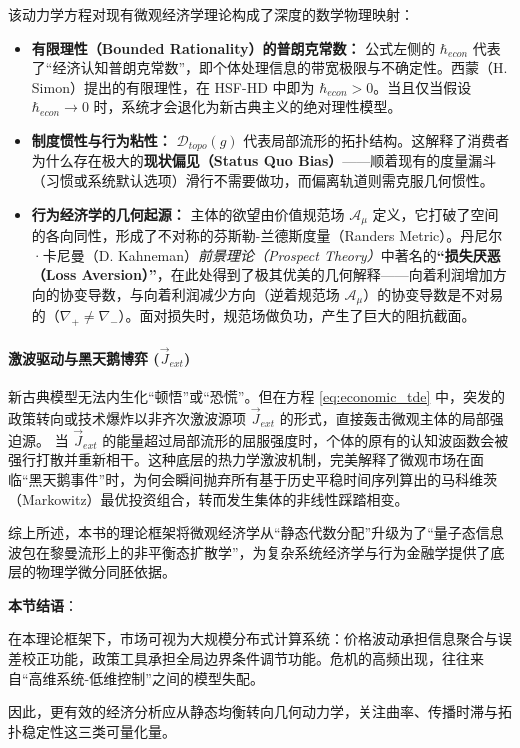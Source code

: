 该动力学方程对现有微观经济学理论构成了深度的数学物理映射：
\begin{itemize}
    \item \textbf{有限理性（Bounded Rationality）的普朗克常数：} 公式左侧的 $\hbar_{econ}$ 代表了“经济认知普朗克常数”，即个体处理信息的带宽极限与不确定性。西蒙（H. Simon）提出的有限理性，在 HSF-HD 中即为 $\hbar_{econ} > 0$。当且仅当假设 $\hbar_{econ} \to 0$ 时，系统才会退化为新古典主义的绝对理性模型。
    \item \textbf{制度惯性与行为粘性：} $\mathcal{D}_{topo}(g)$ 代表局部流形的拓扑结构。这解释了消费者为什么存在极大的\textbf{现状偏见（Status Quo Bias）}——顺着现有的度量漏斗（习惯或系统默认选项）滑行不需要做功，而偏离轨道则需克服几何惯性。
    \item \textbf{行为经济学的几何起源：} 主体的欲望由价值规范场 $\mathcal{A}_\mu$ 定义，它打破了空间的各向同性，形成了不对称的芬斯勒-兰德斯度量（Randers Metric）。丹尼尔·卡尼曼（D. Kahneman）\textit{前景理论（Prospect Theory）}中著名的\textbf{“损失厌恶（Loss Aversion）”}，在此处得到了极其优美的几何解释——向着利润增加方向的协变导数，与向着利润减少方向（逆着规范场 $\mathcal{A}_\mu$）的协变导数是不对易的（$ \nabla_{+} \neq \nabla_{-} $）。面对损失时，规范场做负功，产生了巨大的阻抗截面。
\end{itemize}

\paragraph{激波驱动与黑天鹅博弈 ($\vec{J}_{ext}$)}
新古典模型无法内生化“顿悟”或“恐慌”。但在方程 \ref{eq:economic_tde} 中，突发的政策转向或技术爆炸以非齐次激波源项 $\vec{J}_{ext}$ 的形式，直接轰击微观主体的局部强迫源。
当 $\vec{J}_{ext}$ 的能量超过局部流形的屈服强度时，个体的原有的认知波函数会被强行打散并重新相干。这种底层的热力学激波机制，完美解释了微观市场在面临“黑天鹅事件”时，为何会瞬间抛弃所有基于历史平稳时间序列算出的马科维茨（Markowitz）最优投资组合，转而发生集体的非线性踩踏相变。

综上所述，本书的理论框架将微观经济学从“静态代数分配”升级为了“量子态信息波包在黎曼流形上的非平衡态扩散学”，为复杂系统经济学与行为金融学提供了底层的物理学微分同胚依据。

\begin{bquote}
    \textbf{本节结语}：

    在本理论框架下，市场可视为大规模分布式计算系统：价格波动承担信息聚合与误差校正功能，政策工具承担全局边界条件调节功能。危机的高频出现，往往来自“高维系统-低维控制”之间的模型失配。

    因此，更有效的经济分析应从静态均衡转向几何动力学，关注曲率、传播时滞与拓扑稳定性这三类可量化量。
\end{bquote}




